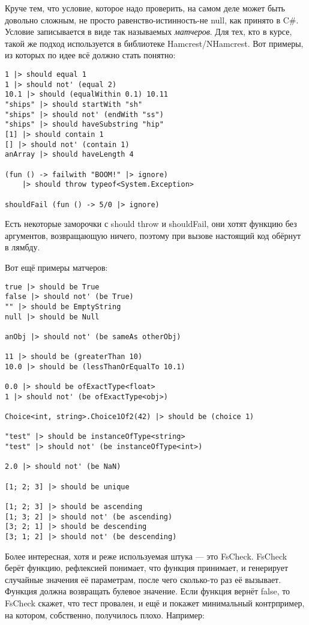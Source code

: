 \documentclass[a5paper]{article}
\begin{document}
Круче тем, что условие, которое надо проверить, на самом деле может быть довольно сложным, не просто равенство-истинность-не null, как принято в C\#. Условие записывается в виде так называемых \textit{матчеров}. Для тех, кто в курсе, такой же подход используется в библиотеке Hamcrest/NHamcrest. Вот примеры, из которых по идее всё должно стать понятно:

\begin{verbatim}
1 |> should equal 1
1 |> should not' (equal 2)
10.1 |> should (equalWithin 0.1) 10.11
"ships" |> should startWith "sh"
"ships" |> should not' (endWith "ss")
"ships" |> should haveSubstring "hip"
[1] |> should contain 1
[] |> should not' (contain 1)
anArray |> should haveLength 4

(fun () -> failwith "BOOM!" |> ignore) 
    |> should throw typeof<System.Exception>

shouldFail (fun () -> 5/0 |> ignore)
\end{verbatim}

Есть некоторые заморочки с should throw и shouldFail, они хотят функцию без аргументов, возвращающую ничего, поэтому при вызове настоящий код обёрнут в лямбду.

Вот ещё примеры матчеров:

\begin{verbatim}
true |> should be True
false |> should not' (be True)
"" |> should be EmptyString
null |> should be Null

anObj |> should not' (be sameAs otherObj)

11 |> should be (greaterThan 10)
10.0 |> should be (lessThanOrEqualTo 10.1)

0.0 |> should be ofExactType<float>
1 |> should not' (be ofExactType<obj>)

Choice<int, string>.Choice1Of2(42) |> should be (choice 1)

"test" |> should be instanceOfType<string>
"test" |> should not' (be instanceOfType<int>)

2.0 |> should not' (be NaN)

[1; 2; 3] |> should be unique

[1; 2; 3] |> should be ascending
[1; 3; 2] |> should not' (be ascending)
[3; 2; 1] |> should be descending
[3; 1; 2] |> should not' (be descending)
\end{verbatim}

Более интересная, хотя и реже используемая штука --- это FsCheck. FsCheck берёт функцию, рефлексией понимает, что функция принимает, и генерирует случайные значения её параметрам, после чего сколько-то раз её вызывает. Функция должна возвращать булевое значение. Если функция вернёт false, то FsCheck скажет, что тест провален, и ещё и покажет минимальный контрпример, на котором, собственно, получилось плохо. Например: 
\end{document}

